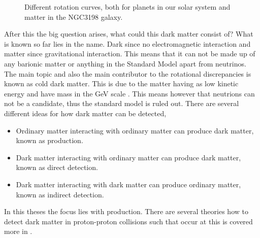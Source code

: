  \begin{figure}[h] %
    \hfill
    \caption{Different rotation curves, both for planets in our solar system and matter in the NGC3198 galaxy.}
    \label{fig:rotation}
  \end{figure}
After this the big question arises, what could this dark matter consist of? What is known so far lies in the name. Dark since no electromagnetic interaction and matter since gravitational interaction. This means that it can not be made up of any barionic matter or anything in the Standard Model apart from neutrinos. The main topic and also the main contributor to the rotational discrepancies is known as cold dark matter. This is due to the matter having as low kinetic energy and have mass in the GeV scale \citep{Goodman:2010,CERN-PH-EP-2012-210,Jungman:1996}. This means however that neutrions can not be a candidate, thus the standard model is ruled out. 
There are several different ideas for how dark matter can be detected, \citep{Jungman:1996}
\begin{itemize}
\item Ordinary matter interacting with ordinary matter can produce dark matter, known as production.
\item Dark matter interacting with ordinary matter can produce dark matter, known as direct detection.
\item Dark matter interacting with dark matter can produce ordinary matter, known as indirect detection.
\end{itemize} 
In this theses the focus lies with production. There are several theories how to detect dark matter in proton-proton collisions such that occur at \abbrCERN this is covered more in . 


